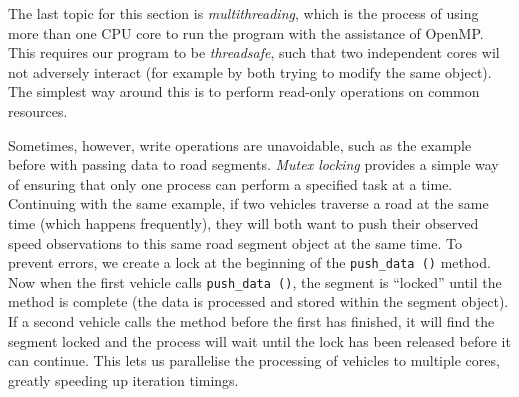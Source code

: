 The last topic for this section is \emph{multithreading}, which is the process of using more than one CPU core to run the program with the assistance of OpenMP. This requires our program to be \emph{threadsafe}, such that two independent cores wil not adversely interact (for example by both trying to modify the same object). The simplest way around this is to perform read-only operations on common resources.

Sometimes, however, write operations are unavoidable, such as the example before with passing data to road segments. \emph{Mutex locking} provides a simple way of ensuring that only one process can perform a specified task at a time. Continuing with the same example, if two vehicles traverse a road at the same time (which happens frequently), they will both want to push their observed speed observations to this same road segment object at the same time. To prevent errors, we create a lock at the beginning of the \verb+push_data ()+ method. Now when the first vehicle calls \verb+push_data ()+, the segment is ``locked'' until the method is complete (the data is processed and stored within the segment object). If a second vehicle calls the method before the first has finished, it will find the segment locked and the process will wait until the lock has been released before it can continue. This lets us parallelise the processing of vehicles to multiple cores, greatly speeding up iteration timings.
